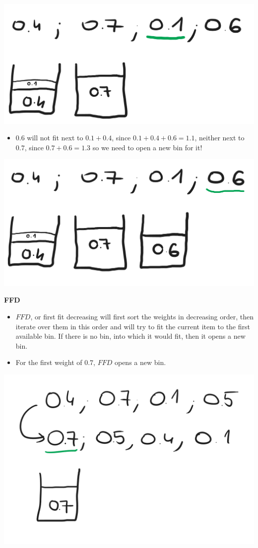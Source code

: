 \begin{center}
    \includegraphics[width=0.5\linewidth]{10/01/ff_alt_03.png}
\end{center}

\begin{itemize}
    \item $0.6$ will not fit next to $0.1+0.4$, since $0.1+0.4+0.6=1.1$, neither next to $0.7$, since $0.7+0.6=1.3$ so we need to open a new bin for it!
\end{itemize}

\begin{center}
    \includegraphics[width=0.5\linewidth]{10/01/ff_alt_04.png}
\end{center}

\textbf{FFD}

\begin{itemize}
    \item $FFD$, or first fit decreasing will first sort the weights in decreasing order, then iterate over them in this order and will try to fit the current item to the first available bin. If there is no bin, into which it would fit, then it opens a new bin.
    \item For the first weight of $0.7$, $FFD$ opens a new bin.
\end{itemize}

\begin{center}
    \includegraphics[width=0.5\linewidth]{10/01/ffd_01.png}
\end{center}


